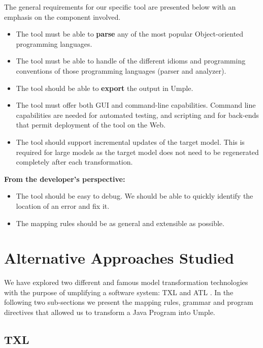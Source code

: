 The general requirements for our specific tool are presented below with an emphasis on the component involved.

\begin{itemize}
\item The tool must be able to \textbf{parse} any of the most popular Object-oriented programming languages.
\item The tool must be able to handle of  the different idioms and programming conventions of those programming languages (parser and analyzer).
\item The tool should be able to \textbf{export} the output in Umple.
\item The tool must offer both GUI and command-line capabilities. Command line capabilities are needed for automated testing, and scripting and for back-ends that permit deployment of the tool on the Web.
\item The tool should support incremental updates of the target model. This is required for large models as the target model does not need to be regenerated completely after each transformation. 
\end{itemize}


\textbf{From the developer's perspective:}
\begin{itemize}
\item The tool should be easy to debug. We should be able to quickly identify the location of an error and fix it.
\item The mapping rules should be as general and extensible as possible. 
\end{itemize}


\section{Alternative Approaches Studied}
We have explored two different and famous model transformation technologies with the purpose of umplifying a software system: TXL \cite{Cordy2006} and ATL \cite{atl}. In the following two sub-sections we present the mapping rules, grammar and program directives that allowed us to transform a Java Program into Umple. 

\subsection{TXL}

